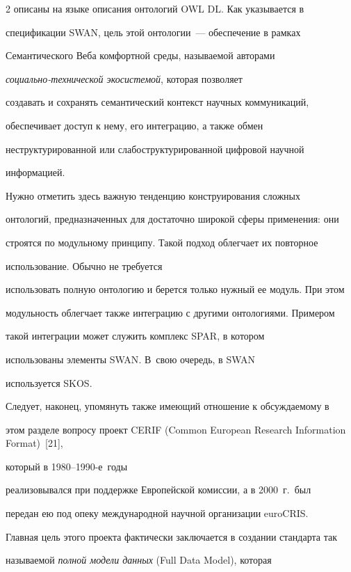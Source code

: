 \begin{multicols}{2}
описаны на языке описания онтологий {OWL DL}. Как указывается в 


спецификации {SWAN}, цель этой онтологии~--- обеспечение в рамках 


Семантического Веба комфортной среды, называемой авторами 


  \textit{со\-ци\-аль\-но-тех\-ни\-че\-ской экосистемой}, которая позволяет 


создавать и сохранять семантический контекст научных коммуникаций, 


обеспечивает доступ к нему, его интеграцию, а также обмен 


неструктурированной или слабоструктурированной цифровой научной 


информацией.


  


  Нужно отметить здесь важную тенденцию конструирования сложных 


онтологий, предназначенных для достаточно широкой сферы применения: они 


строятся по модульному принципу. Такой подход облегчает их повторное 


использование. Обыч\-но не требуется 


использовать полную онтологию и берется только нужный ее модуль. При этом 


модульность облегчает также интеграцию с другими онтологиями. Примером 


такой интеграции может служить комплекс {SPAR}, в котором 


использованы элементы {SWAN}. В~свою очередь, в {SWAN} 


используется {SKOS}. 


  


  Следует, наконец, упомянуть также имеющий отношение к обсуждаемому в 


этом разделе вопросу проект CERIF (Common European Research Information Format)~[21], 


который в 1980--1990-е~годы 


реализовывался при поддержке Европейской комиссии, а в 2000~г.\ был 


передан ею под опеку международной научной организации {euroCRIS}. 


Главная цель этого проекта фактически заключается в создании стандарта так 


называемой \textit{полной модели данных} ({Full Data Model}), которая 



\end{multicols}
